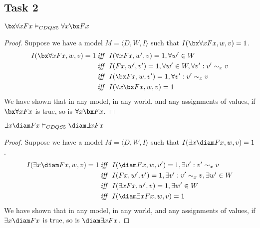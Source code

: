 \subsection*{Task 2}

\begin{claim}
$\bx \forall x Fx \vDash_{CDQS5} \forall x \bx Fx$
\end{claim}

\begin{proof}
Suppose we have a model $M = \langle D, W, I \rangle$ such that $I(\bx \forall x Fx, w, v) = 1$.
\begin{align*}
I(\bx \forall x Fx, w, v) = 1
&\mathbin{\mathit{iff}}\ I(\forall x Fx, w', v) = 1, \forall w' \in W \\
&\mathbin{\mathit{iff}}\ I(Fx, w', v') = 1, \forall w' \in W, \forall v': v' \sim_x v \\
&\mathbin{\mathit{iff}}\ I(\bx Fx, w, v') = 1, \forall v': v' \sim_x v \\
&\mathbin{\mathit{iff}}\ I(\forall x \bx Fx, w, v) = 1
\end{align*}
We have shown that in any model, in any world, and any assignments of values, if $\bx \forall x Fx$ is true, so is $\forall x \bx Fx$.
\end{proof}

\begin{claim}
$\exists x \diam Fx \vDash_{CDQS5} \diam \exists x Fx$
\end{claim}

\begin{proof}
Suppose we have a model $M = \langle D, W, I \rangle$ such that $I(\exists x \diam Fx, w, v) = 1$.
\begin{align*}
I(\exists x \diam Fx, w, v) = 1
&\mathbin{\mathit{iff}}\ I(\diam Fx, w, v') = 1, \exists v': v' \sim_x v \\
&\mathbin{\mathit{iff}}\ I(Fx, w', v') = 1, \exists v': v' \sim_x v, \exists w' \in W \\
&\mathbin{\mathit{iff}}\ I(\exists x Fx, w', v) = 1, \exists w' \in W \\
&\mathbin{\mathit{iff}}\ I(\diam \exists x Fx, w, v) = 1
\end{align*}
We have shown that in any model, in any world, and any assignments of values, if $\exists x \diam Fx$ is true, so is $\diam \exists x Fx$.
\end{proof}
